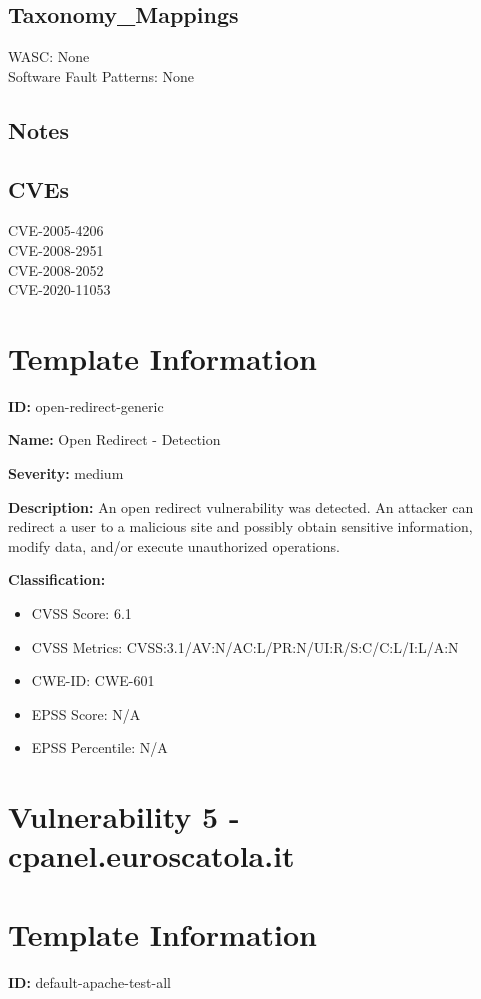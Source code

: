 \subsection*{Taxonomy\_Mappings}
WASC: None\\
Software Fault Patterns: None\\
\subsection*{Notes}
\subsection*{CVEs}
CVE-2005-4206\\
CVE-2008-2951\\
CVE-2008-2052\\
CVE-2020-11053\\
\section*{Template Information}
\textbf{ID:} open-redirect-generic

\textbf{Name:} Open Redirect - Detection

\textbf{Severity:} medium

\textbf{Description:} An open redirect vulnerability was detected. An attacker can redirect a user to a malicious site and possibly obtain sensitive information, modify data, and/or execute unauthorized operations.

\textbf{Classification:}
\begin{itemize}
\item CVSS Score: 6.1
\item CVSS Metrics: CVSS:3.1/AV:N/AC:L/PR:N/UI:R/S:C/C:L/I:L/A:N
\item CWE-ID: CWE-601
\item EPSS Score: N/A
\item EPSS Percentile: N/A
\end{itemize}



\section*{Vulnerability 5 - cpanel.euroscatola.it}

\section*{Template Information}
\textbf{ID:} default-apache-test-all

